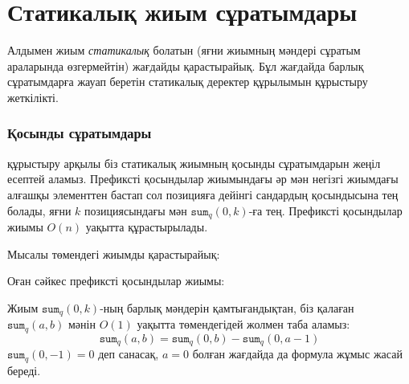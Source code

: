 \section{Статикалық жиым сұратымдары}

Алдымен жиым \emph{статикалық} болатын (яғни жиымның 
мәндері сұратым араларында өзгермейтін) жағдайды
қарастырайық. Бұл жағдайда барлық сұратымдарға жауап беретін 
статикалық деректер құрылымын құрыстыру жеткілікті.

\subsubsection{Қосынды сұратымдары}


 құрыстыру арқылы
біз статикалық жиымның 
қосынды сұратымдарын жеңіл есептей аламыз.
Префиксті қосындылар жиымындағы әр мән 
негізгі жиымдағы алғашқы элементтен бастап сол позицияға дейінгі сандардың қосындысына тең болады,
яғни $k$ позициясындағы мән $\texttt{sum}_q(0,k)$-ға тең. 
Префиксті қосындылар жиымы $O(n)$ уақытта құрастырылады.

Мысалы төмендегі жиымды қарастырайық:
\begin{center}
\end{center}
Оған сәйкес префиксті қосындылар жиымы:
\begin{center}
\end{center}
Жиым $\texttt{sum}_q(0,k)$-ның 
барлық мәндерін қамтығандықтан,
біз қалаған $\texttt{sum}_q(a,b)$ мәнін $O(1)$ 
уақытта төмендегідей жолмен таба аламыз:
\[ \texttt{sum}_q(a,b) = \texttt{sum}_q(0,b) - \texttt{sum}_q(0,a-1)\]
$\texttt{sum}_q(0,-1)=0$ деп санасақ, 
$a=0$ болған жағдайда да формула жұмыс жасай береді. 

